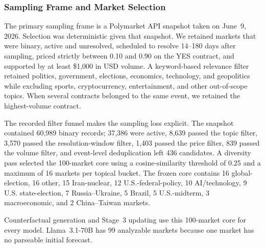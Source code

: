 \subsubsection{Sampling Frame and Market Selection}
\label{app:market-selection}

The primary sampling frame is a Polymarket API snapshot taken on June~9, 2026.
Selection was deterministic given that snapshot.  We retained markets that were
binary, active and unresolved, scheduled to resolve 14--180 days after sampling,
priced strictly between 0.10 and 0.90 on the YES contract, and supported by at least
\$1,000 in USD volume.  A keyword-based relevance filter retained politics,
government, elections, economics, technology, and geopolitics while excluding
sports, cryptocurrency, entertainment, and other out-of-scope topics.  When several
contracts belonged to the same event, we retained the highest-volume contract.

The recorded filter funnel makes the sampling loss explicit.  The snapshot contained
60,989 binary records; 37,386 were active, 8,639 passed the topic filter, 3,570 passed
the resolution-window filter, 1,403 passed the price filter, 839 passed the volume
filter, and event-level deduplication left 436 candidates.  A diversity pass selected
the 100-market core using a cosine-similarity threshold of 0.25 and a maximum of
16 markets per topical bucket.  The frozen core contains 16 global-election,
16 other, 15 Iran-nuclear, 12 U.S.-federal-policy, 10 AI/technology, 9 U.S.
state-election, 7 Russia--Ukraine, 5 Brazil, 5 U.S.-midterm, 3 macroeconomic,
and 2 China--Taiwan markets.

Counterfactual generation and Stage~3 updating use this 100-market core for every
model. Llama~3.1-70B has 99 analyzable markets because one market has no parseable
initial forecast.

\begin{center}
\begin{minipage}{\linewidth}
\centering
{}
\label{tab:markets}
\footnotesize
{}
\end{minipage}
\end{center}

